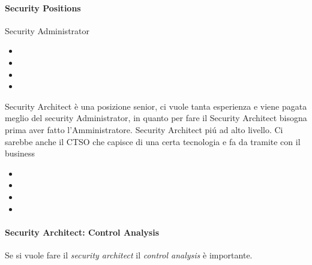 

\paragraph{Security Positions} 
Security Administrator

\begin{itemize}
\item 
\item 
\item
\item 
\end{itemize}
Security Architect è una posizione senior, ci vuole tanta esperienza e viene 
pagata meglio del security Administrator, in quanto per fare il Security 
Architect bisogna prima aver fatto l'Amministratore. 
Security Architect piú ad alto livello. Ci sarebbe anche il CTSO che capisce di 
una certa tecnologia e fa da tramite con il business
\begin{itemize}
\item 
\item 
\item
\item 
\end{itemize}
\paragraph{Security Architect: Control Analysis}

Se si vuole fare il \textit{security architect} il \textit{control analysis} è 
importante.

